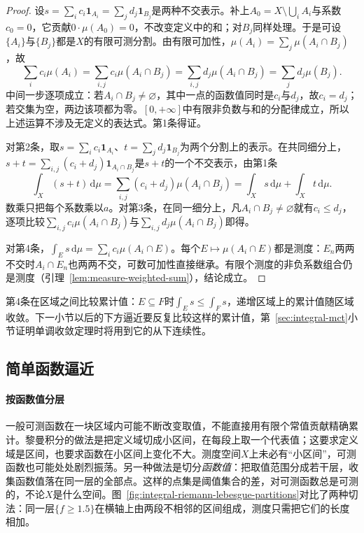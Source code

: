 \begin{proof}
设$s=\sum_ic_i\mathbf 1_{A_i}=\sum_jd_j\mathbf 1_{B_j}$是两种不交表示。补上$A_0=X\setminus\bigcup_iA_i$与系数$c_0=0$，它贡献$0\cdot\mu(A_0)=0$，不改变定义中的和；对$B_j$同样处理。于是可设$\{A_i\}$与$\{B_j\}$都是$X$的有限可测分割。由有限可加性，$\mu(A_i)=\sum_j\mu(A_i\cap B_j)$，故
\[
 \sum_ic_i\mu(A_i)=\sum_{i,j}c_i\mu(A_i\cap B_j)=\sum_{i,j}d_j\mu(A_i\cap B_j)=\sum_jd_j\mu(B_j).
\]
中间一步逐项成立：若$A_i\cap B_j\ne\varnothing$，其中一点的函数值同时是$c_i$与$d_j$，故$c_i=d_j$；若交集为空，两边该项都为零。$[0,+\infty]$中有限非负数与和的分配律成立，所以上述运算不涉及无定义的表达式。第1条得证。

对第2条，取$s=\sum_ic_i\mathbf 1_{A_i}$、$t=\sum_jd_j\mathbf 1_{B_j}$为两个分割上的表示。在共同细分上，$s+t=\sum_{i,j}(c_i+d_j)\mathbf 1_{A_i\cap B_j}$是$s+t$的一个不交表示，由第1条
\[
 \int_X(s+t)\,\mathrm d\mu=\sum_{i,j}(c_i+d_j)\mu(A_i\cap B_j)=\int_Xs\,\mathrm d\mu+\int_Xt\,\mathrm d\mu.
\]
数乘只把每个系数乘以$a$。对第3条，在同一细分上，凡$A_i\cap B_j\ne\varnothing$就有$c_i\le d_j$，逐项比较$\sum_{i,j}c_i\mu(A_i\cap B_j)$与$\sum_{i,j}d_j\mu(A_i\cap B_j)$即得。

对第4条，$\int_Es\,\mathrm d\mu=\sum_ic_i\mu(A_i\cap E)$。每个$E\mapsto\mu(A_i\cap E)$都是测度：$E_n$两两不交时$A_i\cap E_n$也两两不交，可数可加性直接继承。有限个测度的非负系数组合仍是测度（引理~\ref{lem:measure-weighted-sum}），结论成立。
\end{proof}

第4条在区域之间比较累计值：$E\subseteq F$时$\int_Es\le\int_Fs$，递增区域上的累计值随区域收敛。下一小节以后的下方逼近要反复比较这样的累计值，第~\ref{sec:integral-mct}小节证明单调收敛定理时将用到它的从下连续性。

\subsection{简单函数逼近}
\label{sec:integral-simple-approximation}

\paragraph{按函数值分层}
一般可测函数在一块区域内可能不断改变取值，不能直接用有限个常值贡献精确累计。黎曼积分的做法是把定义域切成小区间，在每段上取一个代表值；这要求定义域是区间，也要求函数在小区间上变化不大。测度空间$X$上未必有“小区间”，可测函数也可能处处剧烈振荡。另一种做法是切分\emph{函数值}：把取值范围分成若干层，收集函数值落在同一层的全部点。这样的点集是阈值集合的差，对可测函数总是可测的，不论$X$是什么空间。图~\ref{fig:integral-riemann-lebesgue-partitions}对比了两种切法：同一层$\{f\ge1.5\}$在横轴上由两段不相邻的区间组成，测度只需把它们的长度相加。

